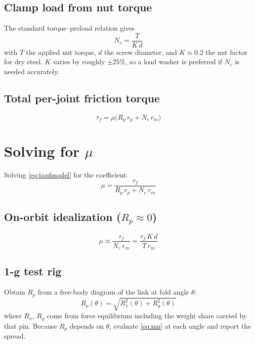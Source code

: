 \documentclass[11pt]{article}
\newcommand{\tauf}{\tau_f}
\newcommand{\Nc}{N_c}      %
\newcommand{\Rp}{R_p}      %
\begin{document}
\subsection*{Clamp load from nut torque}

The standard torque--preload relation gives
\begin{equation}
\Nc = \frac{T}{K\,d}
\label{eq:clamp}
\end{equation}
with $T$ the applied nut torque, $d$ the screw diameter, and $K\approx0.2$ the nut factor for dry
steel. $K$ varies by roughly $\pm25\%$, so a load washer is preferred if $\Nc$ is needed
accurately.

\subsection*{Total per-joint friction torque}

\begin{equation}
\tauf = \mu\big(\Rp\,r_p + \Nc\,r_m\big)
\label{eq:taufmodel}
\end{equation}

\section{Solving for $\mu$}

Solving \eqref{eq:taufmodel} for the coefficient:
\begin{equation}
\boxed{\mu = \frac{\tauf}{\Rp\,r_p + \Nc\,r_m}}
\label{eq:mu}
\end{equation}

\subsection*{On-orbit idealization ($\Rp\approx0$)}

\begin{equation}
\mu \approx \frac{\tauf}{\Nc\,r_m} = \frac{\tauf\,K\,d}{T\,r_m}
\end{equation}

\subsection*{1-g test rig}

Obtain $\Rp$ from a free-body diagram of the link at fold angle $\theta$:
\begin{equation}
\Rp(\theta) = \sqrt{R_x^{2}(\theta)+R_y^{2}(\theta)}
\end{equation}
where $R_x$, $R_y$ come from force equilibrium including the weight share carried by that pin.
Because $\Rp$ depends on $\theta$, evaluate \eqref{eq:mu} at each angle and report the spread.
\end{document}
